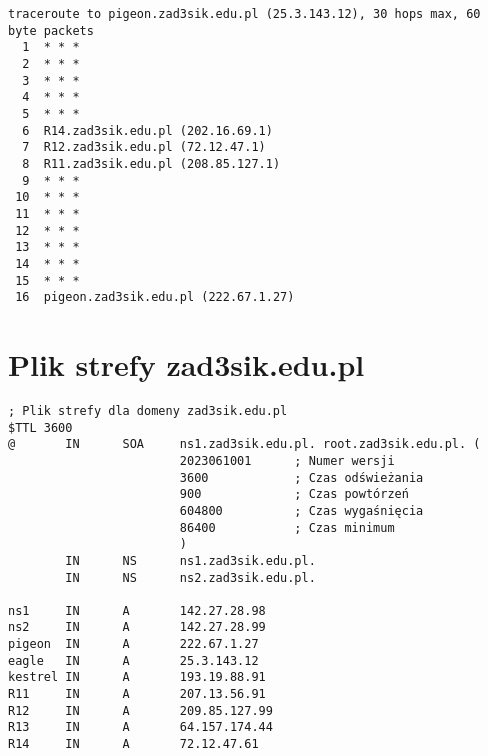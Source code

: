 \documentclass[12pt, a4paper]{article}
\begin{document}
\begin{verbatim}
traceroute to pigeon.zad3sik.edu.pl (25.3.143.12), 30 hops max, 60 byte packets
  1  * * *
  2  * * *
  3  * * *
  4  * * *
  5  * * *
  6  R14.zad3sik.edu.pl (202.16.69.1)
  7  R12.zad3sik.edu.pl (72.12.47.1)
  8  R11.zad3sik.edu.pl (208.85.127.1)
  9  * * *
 10  * * *
 11  * * *
 12  * * *
 13  * * *
 14  * * *
 15  * * *
 16  pigeon.zad3sik.edu.pl (222.67.1.27)
\end{verbatim}

\clearpage

\section{Plik strefy zad3sik.edu.pl}

\begin{verbatim}
; Plik strefy dla domeny zad3sik.edu.pl
$TTL 3600
@       IN      SOA     ns1.zad3sik.edu.pl. root.zad3sik.edu.pl. (
                        2023061001      ; Numer wersji
                        3600            ; Czas odświeżania
                        900             ; Czas powtórzeń
                        604800          ; Czas wygaśnięcia
                        86400           ; Czas minimum
                        )
        IN      NS      ns1.zad3sik.edu.pl.
        IN      NS      ns2.zad3sik.edu.pl.

ns1     IN      A       142.27.28.98
ns2     IN      A       142.27.28.99
pigeon  IN      A       222.67.1.27
eagle   IN      A       25.3.143.12
kestrel IN      A       193.19.88.91
R11     IN      A       207.13.56.91
R12     IN      A       209.85.127.99
R13     IN      A       64.157.174.44
R14     IN      A       72.12.47.61
\end{verbatim}
\end{document}
